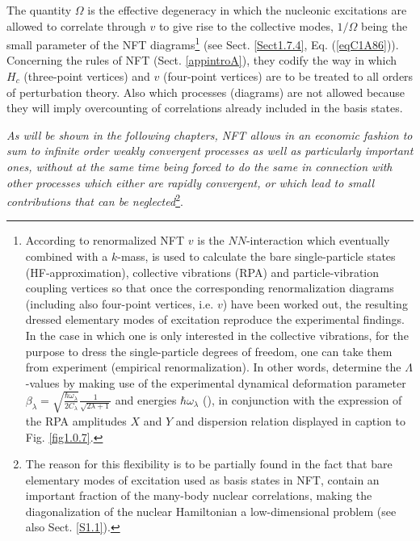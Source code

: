 The quantity $\Omega$ is the effective degeneracy in which the nucleonic excitations are allowed to correlate through $v$ to give rise to the collective modes, $1/\Omega$ being the small parameter of the NFT diagrams\footnote{According to renormalized NFT $v$ is the $NN$-interaction which eventually combined with a $k$-mass, is used to calculate the bare single-particle states (HF-approximation), collective vibrations (RPA) and particle-vibration coupling vertices so that once the corresponding renormalization  diagrams (including also four-point vertices, i.e. $v$) have been worked out, the resulting dressed elementary modes of excitation reproduce the experimental findings. In the case in which  one is only interested in the collective vibrations, for the purpose to dress the single-particle degrees of freedom, one can take them from experiment (empirical renormalization). In other words, determine the $\Lambda$-values by making use of the experimental dynamical deformation parameter $\beta_\lambda=\sqrt{\frac{\hbar\omega_\lambda}{2C_\lambda}}\frac{1}{\sqrt{2\lambda+1}}$ and energies $\hbar\omega_\lambda$ (\cite{Broglia:16}), in conjunction with the expression of the RPA amplitudes $X$ and $Y$ and dispersion relation displayed in caption to Fig. \ref{fig1.0.7}.} (see Sect. \ref{Sect1.7.4}, Eq. (\ref{eqC1A86})). Concerning the rules of NFT (Sect. \ref{appintroA}), they codify the way in which $H_c$ (three-point vertices) and $v$ (four-point vertices) are to be treated to all orders of perturbation theory. Also which processes (diagrams) are not allowed because they will imply overcounting of correlations already included in the basis states. 

\textit{As will be shown in the following chapters, NFT allows in an economic fashion to sum to infinite order weakly convergent processes as well as particularly important ones, without at the same time being forced to do the same in connection with other processes which either are rapidly convergent, or which lead to small contributions that can be neglected}\footnote{The reason for this flexibility is to be partially found in the fact that bare elementary modes of excitation used as basis states in NFT, contain an important fraction of the many-body nuclear correlations, making the diagonalization of the nuclear Hamiltonian a low-dimensional problem (see also Sect. \ref{S1.1}).}.

